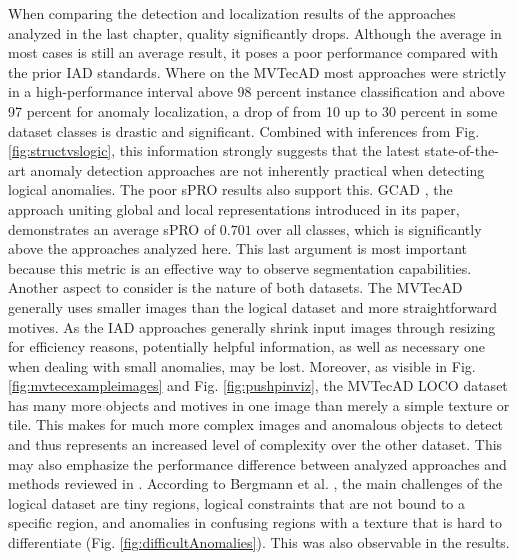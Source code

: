 When comparing the detection and localization results of the approaches analyzed in the last chapter, quality significantly drops. 
Although the average in most cases is still an average result, it poses a poor performance compared with the prior 
IAD standards. Where on the MVTecAD \cite{MVTEC_Bergmann_2021} most approaches were strictly in a high-performance interval above 98 percent 
instance classification and above 97 percent for anomaly localization, a drop of from 10 up to 30 percent in some dataset classes is drastic and significant. 
Combined with inferences from Fig. \ref{fig:structvslogic}, this information strongly suggests that the latest state-of-the-art anomaly detection approaches are not inherently practical when detecting logical anomalies. The poor sPRO results also support this. GCAD \cite{LOCODentsAndScratchesBergmann2022}, the approach uniting global and local representations introduced in its 
paper, demonstrates an average sPRO of $0.701$ over all classes, which is significantly above the approaches analyzed here. This last argument is most important because this metric 
is an effective way to observe segmentation capabilities. \newline
Another aspect to consider is the nature of both datasets. The MVTecAD \cite{MVTEC_Bergmann_2021} generally uses smaller images than the 
logical dataset and more straightforward motives. As the IAD approaches generally shrink input images through resizing for efficiency reasons, 
potentially helpful information, as well as necessary one when dealing with small anomalies, may be lost. 
Moreover, as visible in Fig. \ref{fig:mvtecexampleimages} and Fig. \ref{fig:pushpinviz}, the MVTecAD LOCO dataset 
has many more objects and motives in one image than merely a simple texture or tile. This makes for much more complex images and anomalous objects 
to detect and thus represents an increased level of complexity over the other dataset. This may also emphasize the performance 
difference between analyzed approaches and methods reviewed in \cite{LOCODentsAndScratchesBergmann2022}. \newline
According to Bergmann et al. \cite{LOCODentsAndScratchesBergmann2022}, the main challenges of the logical dataset are tiny regions, logical constraints that are 
not bound to a specific region, and anomalies in confusing regions with a texture that is hard to differentiate (Fig. \ref{fig:difficultAnomalies}). This was also observable in the results.




